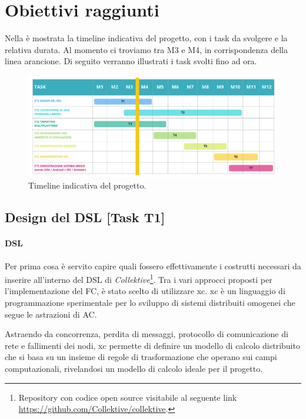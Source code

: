 \documentclass[13pt, a4paper]{article}
\newcommand{\ck}{\emph{Collektive}}
\begin{document}
\section{Obiettivi raggiunti}\label{sec:obiettivi-raggiunti}

Nella  è mostrata la timeline indicativa del progetto, con i task da svolgere e la relativa durata.
%
Al momento ci troviamo tra M3 e M4, in corrispondenza della linea arancione.
%
Di seguito verranno illustrati i task svolti fino ad ora.

\begin{figure}
    \centering
    \includegraphics[width=\textwidth]{images/collektive_timeline}
    \caption{Timeline indicativa del progetto.}
    \label{fig:timeline}
\end{figure}

\subsection{Design del DSL [Task T1]}\label{subsec:t1}

\paragraph{DSL}
Per prima cosa è servito capire quali fossero effettivamente i costrutti necessari da inserire all'interno del DSL di \ck{}\footnote{
    Repository con codice open source visitabile al seguente link \url{https://github.com/Collektive/collektive}.
}.
%
Tra i vari approcci proposti per l'implementazione del \ac{FC}, è stato scelto di utilizzare \ac{xc}.
%
\ac{xc} è un linguaggio di programmazione sperimentale per lo sviluppo di sistemi distribuiti omogenei che segue le astrazioni
    di \ac{AC}.

Astraendo da concorrenza, perdita di messaggi, protocollo di comunicazione di rete e fallimenti dei nodi,
    \ac{xc} permette di definire un modello di calcolo distribuito che si basa su un insieme di regole di trasformazione
    che operano sui campi computazionali,
    rivelandosi un modello di calcolo ideale per il progetto.
\end{document}
